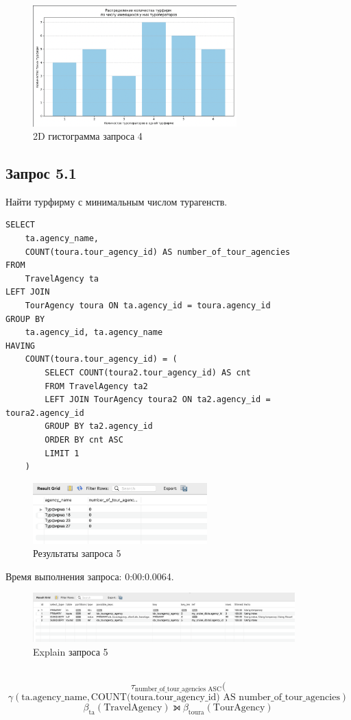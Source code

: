 \documentclass[11pt,a4paper,final]{article}
\begin{document}
\begin{figure}[H]
    \centering
    \includegraphics[width=0.7\textwidth]{53.png} 
    \caption{2D гистограмма  запроса 4}
    \label{fig:hist4}
\end{figure}

\subsection{Запрос 5.1}
Найти турфирму с минимальным числом турагенств.
\begin{lstlisting}[style=sqlstyle, label=sql:query1]
SELECT 
    ta.agency_name, 
    COUNT(toura.tour_agency_id) AS number_of_tour_agencies
FROM 
    TravelAgency ta
LEFT JOIN 
    TourAgency toura ON ta.agency_id = toura.agency_id
GROUP BY 
    ta.agency_id, ta.agency_name
HAVING 
    COUNT(toura.tour_agency_id) = (
        SELECT COUNT(toura2.tour_agency_id) AS cnt
        FROM TravelAgency ta2
        LEFT JOIN TourAgency toura2 ON ta2.agency_id = toura2.agency_id
        GROUP BY ta2.agency_id
        ORDER BY cnt ASC
        LIMIT 1
    )
\end{lstlisting}
\begin{figure}[h!]
    \centering
    \includegraphics[width=0.6\textwidth]{18.png} 
    \caption{Результаты запроса 5}
\end{figure}
{\centering
Время выполнения запроса: 0:00:0.0064.\par}
\begin{figure}[H]
    \centering
    \includegraphics[width=0.9\textwidth]{19.png} 
    \caption{Explain запроса 5}
\end{figure}
\\
$$
\tau_{\text{number\_of\_tour\_agencies ASC}}(
$$
$$
\gamma(\text{ta.agency\_name}, \text{COUNT(toura.tour\_agency\_id) AS number\_of\_tour\_agencies})
$$
$$
\beta_{\text{ta}}(\text{TravelAgency}) \leftouterjoin \beta_{\text{toura}}(\text{TourAgency})
$$
\end{document}
